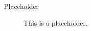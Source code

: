 \documentclass[8pt]{article}
\begin{document}

\begin{multicols}{2}
  \begin{description}
  \item [Placeholder] This is a placeholder.
  \end{description} %
\end{multicols}
\end{document}

